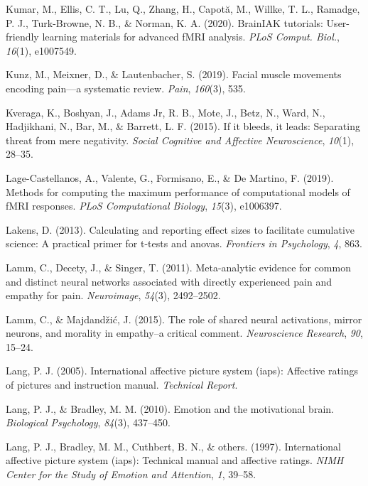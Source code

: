 \documentclass[11pt,american,]{memoir} %
\begin{document}
\leavevmode\hypertarget{ref-Kumar2020-eo}{}%
Kumar, M., Ellis, C. T., Lu, Q., Zhang, H., Capotă, M., Willke, T. L., Ramadge, P. J., Turk-Browne, N. B., \& Norman, K. A. (2020). BrainIAK tutorials: User-friendly learning materials for advanced fMRI analysis. \emph{PLoS Comput. Biol.}, \emph{16}(1), e1007549.

\leavevmode\hypertarget{ref-Kunz2019-uh}{}%
Kunz, M., Meixner, D., \& Lautenbacher, S. (2019). Facial muscle movements encoding pain---a systematic review. \emph{Pain}, \emph{160}(3), 535.

\leavevmode\hypertarget{ref-kveraga2015if}{}%
Kveraga, K., Boshyan, J., Adams Jr, R. B., Mote, J., Betz, N., Ward, N., Hadjikhani, N., Bar, M., \& Barrett, L. F. (2015). If it bleeds, it leads: Separating threat from mere negativity. \emph{Social Cognitive and Affective Neuroscience}, \emph{10}(1), 28--35.

\leavevmode\hypertarget{ref-lage2019methods}{}%
Lage-Castellanos, A., Valente, G., Formisano, E., \& De Martino, F. (2019). Methods for computing the maximum performance of computational models of fMRI responses. \emph{PLoS Computational Biology}, \emph{15}(3), e1006397.

\leavevmode\hypertarget{ref-lakens2013calculating}{}%
Lakens, D. (2013). Calculating and reporting effect sizes to facilitate cumulative science: A practical primer for t-tests and anovas. \emph{Frontiers in Psychology}, \emph{4}, 863.

\leavevmode\hypertarget{ref-lamm2011meta}{}%
Lamm, C., Decety, J., \& Singer, T. (2011). Meta-analytic evidence for common and distinct neural networks associated with directly experienced pain and empathy for pain. \emph{Neuroimage}, \emph{54}(3), 2492--2502.

\leavevmode\hypertarget{ref-lamm2015role}{}%
Lamm, C., \& Majdandžić, J. (2015). The role of shared neural activations, mirror neurons, and morality in empathy--a critical comment. \emph{Neuroscience Research}, \emph{90}, 15--24.

\leavevmode\hypertarget{ref-lang2005international}{}%
Lang, P. J. (2005). International affective picture system (iaps): Affective ratings of pictures and instruction manual. \emph{Technical Report}.

\leavevmode\hypertarget{ref-lang2010emotion}{}%
Lang, P. J., \& Bradley, M. M. (2010). Emotion and the motivational brain. \emph{Biological Psychology}, \emph{84}(3), 437--450.

\leavevmode\hypertarget{ref-lang1997international}{}%
Lang, P. J., Bradley, M. M., Cuthbert, B. N., \& others. (1997). International affective picture system (iaps): Technical manual and affective ratings. \emph{NIMH Center for the Study of Emotion and Attention}, \emph{1}, 39--58.
\end{document}
